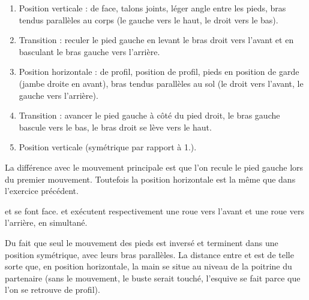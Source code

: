 \begin{exercice}
\label{struc:ex:roue-arrière}

\begin{enumerate}
	\item Position verticale : de face, talons joints, léger angle entre les pieds, bras tendus parallèles au corps (le gauche vers le haut, le droit vers le bas).
	
	\item Transition : reculer le pied gauche en levant le bras droit vers l'avant et en basculant le bras gauche vers l'arrière.
	
	\item Position horizontale : de profil, position de profil, pieds en position de garde (jambe droite en avant), bras tendus parallèles au sol (le droit vers l'avant, le gauche vers l'arrière).
	
	\item Transition : avancer le pied gauche à côté du pied droit, le bras gauche bascule vers le bas, le bras droit se lève vers le haut.
	
	\item Position verticale (symétrique par rapport à 1.).
\end{enumerate}

La différence avec le mouvement principale est que l'on recule le pied gauche lors du premier mouvement.
Toutefois la position horizontale est la même que dans l'exercice précédent.

\end{exercice}


\begin{exercice}
\label{struc:ex:roue-deux}


\A et \D se font face.
\A et \D exécutent respectivement une roue vers l'avant et une roue vers l'arrière, en simultané.

Du fait que seul le mouvement des pieds est inversé \A et \D terminent dans une position symétrique, avec leurs bras parallèles.
La distance entre \A et \D est de telle sorte que, en position horizontale, la main se situe au niveau de la poitrine du partenaire (sans le mouvement, le buste serait touché, l'esquive se fait parce que l'on se retrouve de profil).

\end{exercice}


